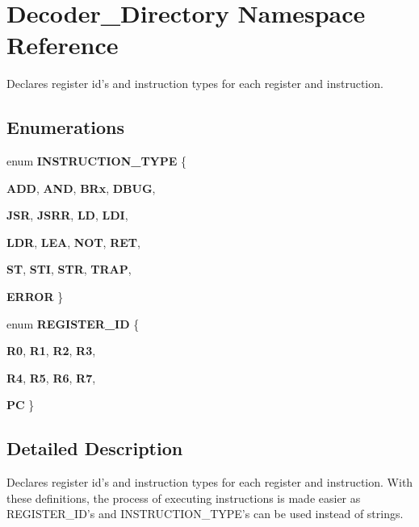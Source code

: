 \hypertarget{namespaceDecoder__Directory}{
\section{Decoder\_\-Directory Namespace Reference}
\label{namespaceDecoder__Directory}
}


Declares register id's and instruction types for each register and instruction.  


\subsection*{Enumerations}
\begin{DoxyCompactItemize}
\item 
enum {\bfseries INSTRUCTION\_\-TYPE} \{ \par
{\bfseries ADD}, 
{\bfseries AND}, 
{\bfseries BRx}, 
{\bfseries DBUG}, 
\par
{\bfseries JSR}, 
{\bfseries JSRR}, 
{\bfseries LD}, 
{\bfseries LDI}, 
\par
{\bfseries LDR}, 
{\bfseries LEA}, 
{\bfseries NOT}, 
{\bfseries RET}, 
\par
{\bfseries ST}, 
{\bfseries STI}, 
{\bfseries STR}, 
{\bfseries TRAP}, 
\par
{\bfseries ERROR}
 \}
\item 
enum {\bfseries REGISTER\_\-ID} \{ \par
{\bfseries R0}, 
{\bfseries R1}, 
{\bfseries R2}, 
{\bfseries R3}, 
\par
{\bfseries R4}, 
{\bfseries R5}, 
{\bfseries R6}, 
{\bfseries R7}, 
\par
{\bfseries PC}
 \}
\end{DoxyCompactItemize}


\subsection{Detailed Description}
Declares register id's and instruction types for each register and instruction. With these definitions, the process of executing instructions is made easier as REGISTER\_\-ID's and INSTRUCTION\_\-TYPE's can be used instead of strings. 